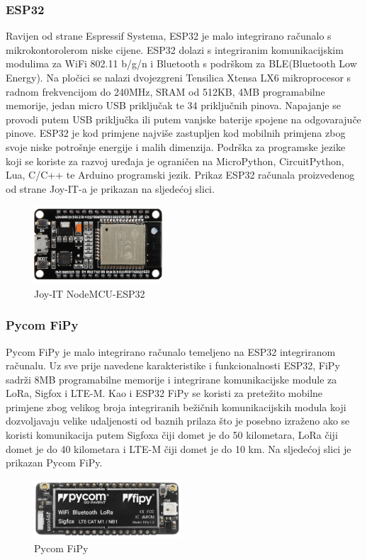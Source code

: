 \documentclass[times, utf8, diplomski]{fer}
\begin{document}
\subsubsection{ESP32}
Ravijen od strane Espressif Systema, ESP32\citep{ESP32} je malo integrirano računalo s mikrokontorolerom niske cijene. ESP32 dolazi s integriranim komunikacijskim modulima za WiFi 802.11 b/g/n i Bluetooth s podrškom za BLE(Bluetooth Low Energy). Na pločici se nalazi dvojezgreni Tensilica Xtensa LX6 mikroprocesor s radnom frekvencijom do 240MHz, SRAM od 512KB, 4MB programabilne memorije, jedan micro USB priključak te 34 priključnih pinova. Napajanje se provodi putem USB priključka ili putem vanjske baterije spojene na odgovarajuče pinove. ESP32 je kod primjene najviše zastupljen kod mobilnih primjena zbog svoje niske potrošnje energije i malih dimenzija. Podrška za programske jezike koji se koriste za razvoj uređaja je ograničen na  MicroPython, CircuitPython, Lua, C/C++ te Arduino programski jezik. Prikaz ESP32 računala proizvedenog od strane Joy-IT-a je prikazan na sljedećoj slici.
\begin{figure}[htb]
    \centering
    \includegraphics[width=4.8cm]{images/esp32.png}
    \caption{Joy-IT NodeMCU-ESP32\citep{ESP32Img}}
    \label{fig:esp32}
\end{figure}

\subsubsection{Pycom FiPy}
Pycom FiPy\citep{Fipy} je malo integrirano računalo temeljeno na ESP32 integriranom računalu. Uz sve prije navedene karakteristike i funkcionalnosti ESP32, FiPy sadrži 8MB programabilne memorije i integrirane komunikacijske module za LoRa, Sigfox i LTE-M. Kao i ESP32 FiPy se koristi za pretežito mobilne primjene zbog velikog broja integriranih bežičnih komunikacijskih modula koji dozvoljavaju velike udaljenosti od baznih prilaza što je posebno izraženo ako se koristi komunikacija putem Sigfoxa čiji domet je do 50 kilometara, LoRa čiji domet je do 40 kilometara i LTE-M čiji domet je do 10 km. Na sljedećoj slici je prikazan Pycom FiPy.
\begin{figure}[htb]
    \centering
    \includegraphics[width=5.5cm]{images/fipy.png}
    \caption{Pycom FiPy\citep{Fipy}}
    \label{fig:fipy}
\end{figure}
\end{document}
